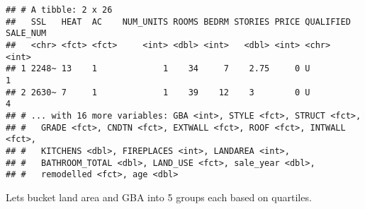 \documentclass[]{article}
\begin{document}
\begin{verbatim}
## # A tibble: 2 x 26
##   SSL   HEAT  AC    NUM_UNITS ROOMS BEDRM STORIES PRICE QUALIFIED SALE_NUM
##   <chr> <fct> <fct>     <int> <dbl> <int>   <dbl> <int> <chr>        <int>
## 1 2248~ 13    1             1    34     7    2.75     0 U                1
## 2 2630~ 7     1             1    39    12    3        0 U                4
## # ... with 16 more variables: GBA <int>, STYLE <fct>, STRUCT <fct>,
## #   GRADE <fct>, CNDTN <fct>, EXTWALL <fct>, ROOF <fct>, INTWALL <fct>,
## #   KITCHENS <dbl>, FIREPLACES <int>, LANDAREA <int>,
## #   BATHROOM_TOTAL <dbl>, LAND_USE <fct>, sale_year <dbl>,
## #   remodelled <fct>, age <dbl>
\end{verbatim}

Lets bucket land area and GBA into 5 groups each based on quartiles.
\end{document}
